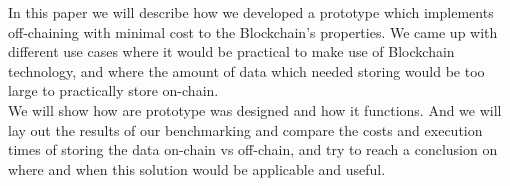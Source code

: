 In this paper we will describe how we developed a prototype which implements off-chaining with minimal cost to the Blockchain’s properties. We came up with different use cases where it would be practical to make use of Blockchain technology, and where the amount of data which needed storing would be too large to practically store on-chain.\\
We will show how are prototype was designed and how it functions. And we will lay out the results of our benchmarking and compare the costs and execution times of storing the data on-chain vs off-chain, and try to reach a conclusion on where and when this solution would be applicable and useful. 


\newpage